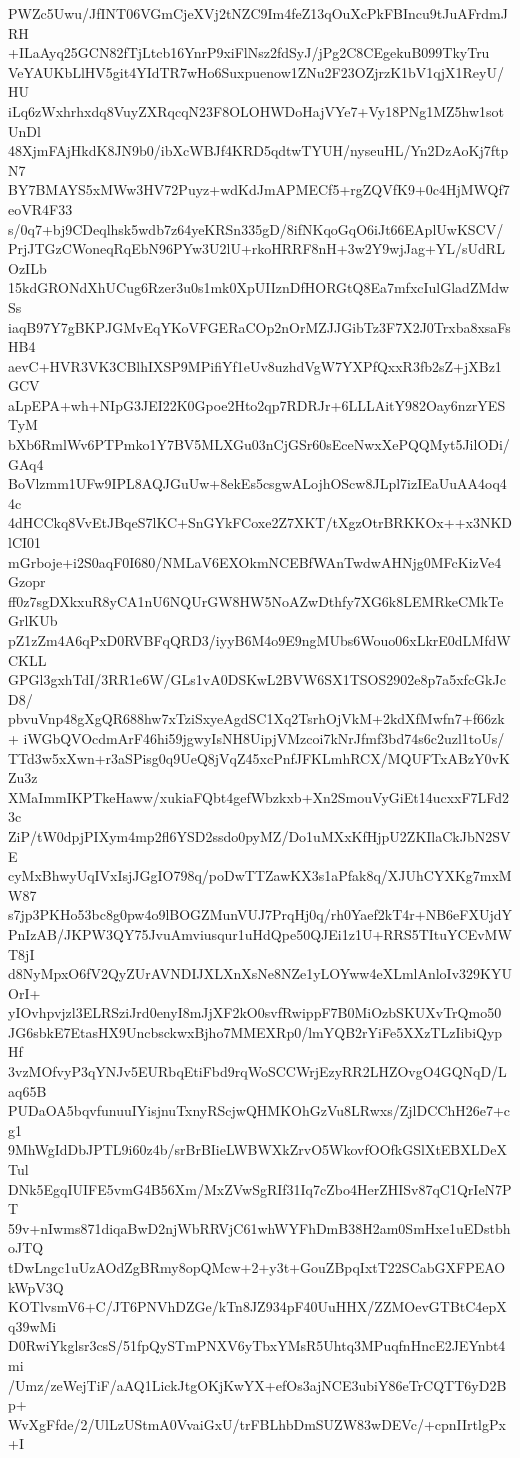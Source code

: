 PWZc5Uwu/JfINT06VGmCjeXVj2tNZC9Im4feZ13qOuXcPkFBIncu9tJuAFrdmJRH
+ILaAyq25GCN82fTjLtcb16YnrP9xiFlNsz2fdSyJ/jPg2C8CEgekuB099TkyTru
VeYAUKbLlHV5git4YIdTR7wHo6Suxpuenow1ZNu2F23OZjrzK1bV1qjX1ReyU/HU
iLq6zWxhrhxdq8VuyZXRqcqN23F8OLOHWDoHajVYe7+Vy18PNg1MZ5hw1sotUnDl
48XjmFAjHkdK8JN9b0/ibXcWBJf4KRD5qdtwTYUH/nyseuHL/Yn2DzAoKj7ftpN7
BY7BMAYS5xMWw3HV72Puyz+wdKdJmAPMECf5+rgZQVfK9+0c4HjMWQf7eoVR4F33
s/0q7+bj9CDeqlhsk5wdb7z64yeKRSn335gD/8ifNKqoGqO6iJt66EAplUwKSCV/
PrjJTGzCWoneqRqEbN96PYw3U2lU+rkoHRRF8nH+3w2Y9wjJag+YL/sUdRLOzILb
15kdGRONdXhUCug6Rzer3u0s1mk0XpUIIznDfHORGtQ8Ea7mfxcIulGladZMdwSs
iaqB97Y7gBKPJGMvEqYKoVFGERaCOp2nOrMZJJGibTz3F7X2J0Trxba8xsaFsHB4
aevC+HVR3VK3CBlhIXSP9MPifiYf1eUv8uzhdVgW7YXPfQxxR3fb2sZ+jXBz1GCV
aLpEPA+wh+NIpG3JEI22K0Gpoe2Hto2qp7RDRJr+6LLLAitY982Oay6nzrYESTyM
bXb6RmlWv6PTPmko1Y7BV5MLXGu03nCjGSr60sEceNwxXePQQMyt5JilODi/GAq4
BoVlzmm1UFw9IPL8AQJGuUw+8ekEs5csgwALojhOScw8JLpl7izIEaUuAA4oq44c
4dHCCkq8VvEtJBqeS7lKC+SnGYkFCoxe2Z7XKT/tXgzOtrBRKKOx++x3NKDlCI01
mGrboje+i2S0aqF0I680/NMLaV6EXOkmNCEBfWAnTwdwAHNjg0MFcKizVe4Gzopr
ff0z7sgDXkxuR8yCA1nU6NQUrGW8HW5NoAZwDthfy7XG6k8LEMRkeCMkTeGrlKUb
pZ1zZm4A6qPxD0RVBFqQRD3/iyyB6M4o9E9ngMUbs6Wouo06xLkrE0dLMfdWCKLL
GPGl3gxhTdI/3RR1e6W/GLs1vA0DSKwL2BVW6SX1TSOS2902e8p7a5xfcGkJcD8/
pbvuVnp48gXgQR688hw7xTziSxyeAgdSC1Xq2TsrhOjVkM+2kdXfMwfn7+f66zk+
iWGbQVOcdmArF46hi59jgwyIsNH8UipjVMzcoi7kNrJfmf3bd74s6c2uzl1toUs/
TTd3w5xXwn+r3aSPisg0q9UeQ8jVqZ45xcPnfJFKLmhRCX/MQUFTxABzY0vKZu3z
XMaImmIKPTkeHaww/xukiaFQbt4gefWbzkxb+Xn2SmouVyGiEt14ucxxF7LFd23c
ZiP/tW0dpjPIXym4mp2fl6YSD2ssdo0pyMZ/Do1uMXxKfHjpU2ZKIlaCkJbN2SVE
cyMxBhwyUqIVxIsjJGgIO798q/poDwTTZawKX3s1aPfak8q/XJUhCYXKg7mxMW87
s7jp3PKHo53bc8g0pw4o9lBOGZMunVUJ7PrqHj0q/rh0Yaef2kT4r+NB6eFXUjdY
PnIzAB/JKPW3QY75JvuAmviusqur1uHdQpe50QJEi1z1U+RRS5TItuYCEvMWT8jI
d8NyMpxO6fV2QyZUrAVNDIJXLXnXsNe8NZe1yLOYww4eXLmlAnloIv329KYUOrI+
yIOvhpvjzl3ELRSziJrd0enyI8mJjXF2kO0svfRwippF7B0MiOzbSKUXvTrQmo50
JG6sbkE7EtasHX9UncbsckwxBjho7MMEXRp0/lmYQB2rYiFe5XXzTLzIibiQypHf
3vzMOfvyP3qYNJv5EURbqEtiFbd9rqWoSCCWrjEzyRR2LHZOvgO4GQNqD/Laq65B
PUDaOA5bqvfunuuIYisjnuTxnyRScjwQHMKOhGzVu8LRwxs/ZjlDCChH26e7+cg1
9MhWgIdDbJPTL9i60z4b/srBrBIieLWBWXkZrvO5WkovfOOfkGSlXtEBXLDeXTul
DNk5EgqIUIFE5vmG4B56Xm/MxZVwSgRIf31Iq7cZbo4HerZHISv87qC1QrIeN7PT
59v+nIwms871diqaBwD2njWbRRVjC61whWYFhDmB38H2am0SmHxe1uEDstbhoJTQ
tDwLngc1uUzAOdZgBRmy8opQMcw+2+y3t+GouZBpqIxtT22SCabGXFPEAOkWpV3Q
KOTlvsmV6+C/JT6PNVhDZGe/kTn8JZ934pF40UuHHX/ZZMOevGTBtC4epXq39wMi
D0RwiYkglsr3csS/51fpQySTmPNXV6yTbxYMsR5Uhtq3MPuqfnHncE2JEYnbt4mi
/Umz/zeWejTiF/aAQ1LickJtgOKjKwYX+efOs3ajNCE3ubiY86eTrCQTT6yD2Bp+
WvXgFfde/2/UlLzUStmA0VvaiGxU/trFBLhbDmSUZW83wDEVc/+cpnIIrtlgPx+I
